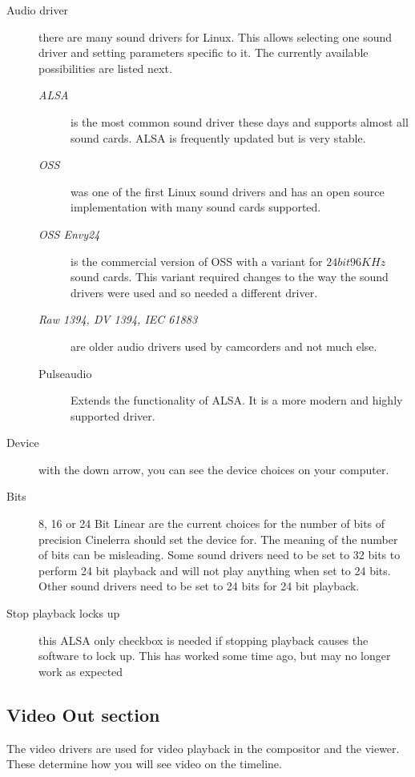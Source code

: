 \begin{description}
    \item[Audio driver] there are many sound drivers for Linux. This allows selecting one sound driver and setting parameters specific to it. The currently available possibilities are listed next.
    \begin{description}
        \item[\textit{ALSA}] is the most common sound driver these days and supports almost all sound cards. ALSA
        is frequently updated but is very stable.
        \item[\textit{OSS}] was one of the first Linux sound drivers and has an open source implementation with many sound cards supported.
        \item[\textit{OSS Envy24}] is the commercial version of OSS with a variant for $24 bit 96 KHz$ sound cards. This variant required changes to the way the sound drivers were used and so needed a different driver.
        \item[\textit{Raw 1394, DV 1394, IEC 61883}] are older audio drivers used by camcorders and not much else.
        \item[Pulseaudio] Extends the functionality of ALSA. It is a more modern and highly supported driver.
    \end{description}
    \item[Device] with the down arrow, you can see the device choices on your computer.
    \item[Bits] 8, 16 or 24 Bit Linear are the current choices for the number of bits of precision Cinelerra should set the device for. The meaning of the number of bits can be misleading. Some sound drivers need to be set to 32 bits to perform 24 bit playback and will not play anything when set to 24 bits. Other sound drivers need to be set to 24 bits for 24 bit playback.
    \item[Stop playback locks up] this ALSA only checkbox is needed if stopping playback causes the software to lock up.  This has worked some time ago, but may no longer work as expected
\end{description}

\subsection{Video Out section}%
\label{sub:video_out_section}

The video drivers are used for video playback in the compositor and the viewer.  These determine how you will see video on the timeline.

